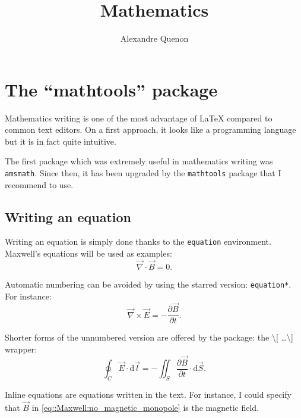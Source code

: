 \documentclass[11pt, a4paper, english]{report}
\title{Mathematics}
\author{Alexandre Quenon}
\begin{document}
\maketitle

\tableofcontents


\chapter{The \enquote{mathtools} package}

	Mathematics writing is one of the most advantage of \LaTeX{} compared to common text editors.
	On a first approach, it looks like a programming language but it is in fact quite intuitive.
	
	The first package which was extremely useful in mathematics writing was \texttt{amsmath}.
	Since then, it has been upgraded by the \texttt{mathtools} package that I recommend to use.
	
	
	\section{Writing an equation}
	
		Writing an equation is simply done thanks to the \texttt{equation} environment.
		Maxwell's equations will be used as examples:
		\begin{equation}
			\vec{\nabla}\cdot\vec{B}=0.
			\label{eq::Maxwell:no_magnetic_monopole}
		\end{equation}
		
		Automatic numbering can be avoided by using the starred version: \texttt{equation*}.
		For instance:
		\begin{equation*}
			\vec{\nabla}\times\vec{E}=-\frac{\partial\vec{B}}{\partial t}.
		\end{equation*}
		
		Shorter forms of the unnumbered version are offered by the package: the \textbackslash [ \ldots \textbackslash ] wrapper:
		\[ \oint_{C} \vec{E} \cdot \mathrm{d}\vec{l} = - \iint_{S} \frac{\partial\vec{B}}{\partial t} \cdot \mathrm{d}\vec{S}. \]
		
		Inline equations are equations written in the text.
		For instance, I could specify that $\vec{B}$ in \cref{eq::Maxwell:no_magnetic_monopole} is the magnetic field.
%
\end{document}
